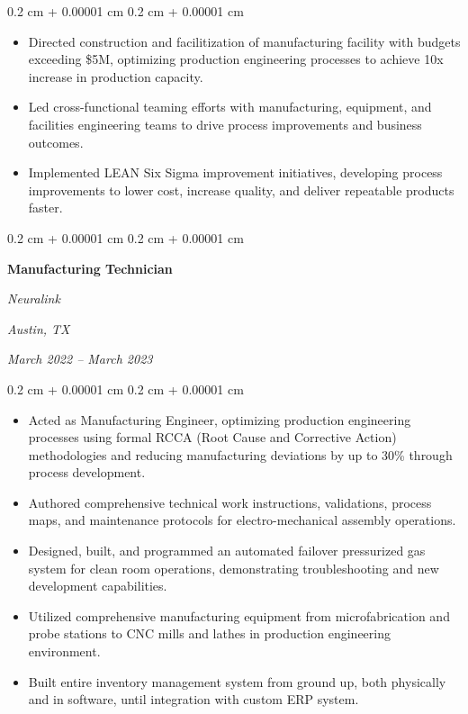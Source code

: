 \documentclass[10pt, letterpaper]{article}
\newenvironment{highlights}{
    \begin{itemize}[
        topsep=0.10 cm,
        parsep=0.10 cm,
        partopsep=0pt,
        itemsep=0pt,
        leftmargin=0.4 cm + 10pt
    ]
}{
    \end{itemize}
} %
\newenvironment{onecolentry}{
    \begin{adjustwidth}{
        0.2 cm + 0.00001 cm
    }{
        0.2 cm + 0.00001 cm
    }
}{
    \end{adjustwidth}
} %
\newenvironment{twocolentry}[2][]{
    \onecolentry
    \def\secondColumn{#2}
    \setcolumnwidth{\fill, 4.5 cm}
    \begin{paracol}{2}
}{
    \switchcolumn \raggedleft \secondColumn
    \end{paracol}
    \endonecolentry
} %
\begin{document}
        \vspace{0.10 cm}
        \begin{onecolentry}
            \begin{highlights}
                \item Directed construction and facilitization of manufacturing facility with budgets exceeding \$5M, optimizing production engineering processes to achieve 10x increase in production capacity.
                \item Led cross-functional teaming efforts with manufacturing, equipment, and facilities engineering teams to drive process improvements and business outcomes.
                \item Implemented LEAN Six Sigma improvement initiatives, developing process improvements to lower cost, increase quality, and deliver repeatable products faster.
            \end{highlights}
        \end{onecolentry}

        \vspace{0.35 cm}

        \begin{twocolentry}{
        \textit{Austin, TX}    
            
        \textit{March 2022 – March 2023}}
            \textbf{Manufacturing Technician}
            
            \textit{Neuralink}
        \end{twocolentry}

        \vspace{0.10 cm}
        \begin{onecolentry}
            \begin{highlights}
                \item Acted as Manufacturing Engineer, optimizing production engineering processes using formal RCCA (Root Cause and Corrective Action) methodologies and reducing manufacturing deviations by up to 30\% through process development.
                \item Authored comprehensive technical work instructions, validations, process maps, and maintenance protocols for electro-mechanical assembly operations.
                \item Designed, built, and programmed an automated failover pressurized gas system for clean room operations, demonstrating troubleshooting and new development capabilities.
                \item Utilized comprehensive manufacturing equipment from microfabrication and probe stations to CNC mills and lathes in production engineering environment.
                \item Built entire inventory management system from ground up, both physically and in software, until integration with custom ERP system.
            \end{highlights}
        \end{onecolentry}
\end{document}
